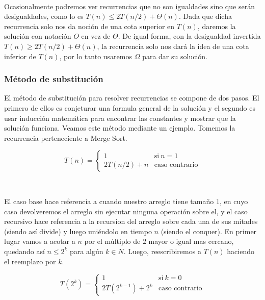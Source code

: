\documentclass[10pt, a4paper]{report}
\begin{document}
~

Ocasionalmente podremos ver recurrencias que no son igualdades sino que ser\'an desigualdades, como lo es $T(n) \leq 2T(n/2) + \Theta(n)$. Dada que dicha recurrencia solo nos da noci\'on de una cota superior en $T(n)$, daremos la soluci\'on con notaci\'on $O$ en vez de $\Theta$. De igual forma, con la desigualdad invertida $T(n) \geq 2T(n/2) + \Theta(n)$, la recurrencia solo nos dar\'a la idea de una cota inferior de $T(n)$, por lo tanto usaremos $\Omega$ para dar su soluci\'on.

\subsubsection{M\'etodo de substituci\'on}

El m\'etodo de substituci\'on para resolver recurrencias se compone de dos pasos. El primero de ellos es conjeturar una formula general de la soluci\'on y el segundo es usar inducci\'on matem\'atica para encontrar las constantes y mostrar que la soluci\'on funciona. Veamos este m\'etodo mediante un ejemplo. Tomemos la recurrencia perteneciente a Merge Sort.

\begin{equation*}
  T(n) = \begin{cases}
	      1         		& \text{si} \ n = 1 \\
	      2T(n/2) + n         	& \text{caso contrario}
	  \end{cases}
\end{equation*}

~

El caso base hace referencia a cuando nuestro arreglo tiene tama\~no $1$, en cuyo caso devolveremos el arreglo sin ejecutar ninguna operaci\'on sobre el, y el caso recursivo hace referencia a la recursion del arreglo sobre cada una de sus mitades (siendo as\'i divide) y luego uni\'endolo en tiempo $n$ (siendo el conquer). En primer lugar vamos a acotar a $n$ por el m\'ultiplo de $2$ mayor o igual mas cercano, quedando as\'i $n \leq 2^k$ para alg\'un $k \in N$. Luego, reescribiremos a $T(n)$ haciendo el reemplazo por $k$.

\begin{equation*}
  T(2^k) = \begin{cases}
	      1         		& \text{si} \ k = 0 \\
	      2T(2^{k-1}) + 2^k        	& \text{caso contrario}
	  \end{cases}
\end{equation*}
\end{document}
